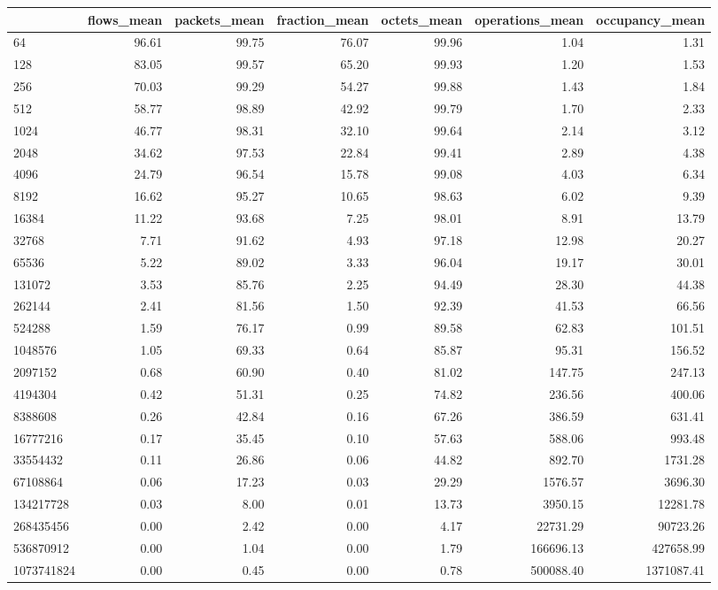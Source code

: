 \begin{tabular}{lrrrrrr}
\toprule
 & flows_mean & packets_mean & fraction_mean & octets_mean & operations_mean & occupancy_mean \\
\midrule
64 & 96.61 & 99.75 & 76.07 & 99.96 & 1.04 & 1.31 \\
128 & 83.05 & 99.57 & 65.20 & 99.93 & 1.20 & 1.53 \\
256 & 70.03 & 99.29 & 54.27 & 99.88 & 1.43 & 1.84 \\
512 & 58.77 & 98.89 & 42.92 & 99.79 & 1.70 & 2.33 \\
1024 & 46.77 & 98.31 & 32.10 & 99.64 & 2.14 & 3.12 \\
2048 & 34.62 & 97.53 & 22.84 & 99.41 & 2.89 & 4.38 \\
4096 & 24.79 & 96.54 & 15.78 & 99.08 & 4.03 & 6.34 \\
8192 & 16.62 & 95.27 & 10.65 & 98.63 & 6.02 & 9.39 \\
16384 & 11.22 & 93.68 & 7.25 & 98.01 & 8.91 & 13.79 \\
32768 & 7.71 & 91.62 & 4.93 & 97.18 & 12.98 & 20.27 \\
65536 & 5.22 & 89.02 & 3.33 & 96.04 & 19.17 & 30.01 \\
131072 & 3.53 & 85.76 & 2.25 & 94.49 & 28.30 & 44.38 \\
262144 & 2.41 & 81.56 & 1.50 & 92.39 & 41.53 & 66.56 \\
524288 & 1.59 & 76.17 & 0.99 & 89.58 & 62.83 & 101.51 \\
1048576 & 1.05 & 69.33 & 0.64 & 85.87 & 95.31 & 156.52 \\
2097152 & 0.68 & 60.90 & 0.40 & 81.02 & 147.75 & 247.13 \\
4194304 & 0.42 & 51.31 & 0.25 & 74.82 & 236.56 & 400.06 \\
8388608 & 0.26 & 42.84 & 0.16 & 67.26 & 386.59 & 631.41 \\
16777216 & 0.17 & 35.45 & 0.10 & 57.63 & 588.06 & 993.48 \\
33554432 & 0.11 & 26.86 & 0.06 & 44.82 & 892.70 & 1731.28 \\
67108864 & 0.06 & 17.23 & 0.03 & 29.29 & 1576.57 & 3696.30 \\
134217728 & 0.03 & 8.00 & 0.01 & 13.73 & 3950.15 & 12281.78 \\
268435456 & 0.00 & 2.42 & 0.00 & 4.17 & 22731.29 & 90723.26 \\
536870912 & 0.00 & 1.04 & 0.00 & 1.79 & 166696.13 & 427658.99 \\
1073741824 & 0.00 & 0.45 & 0.00 & 0.78 & 500088.40 & 1371087.41 \\
\bottomrule
\end{tabular}

